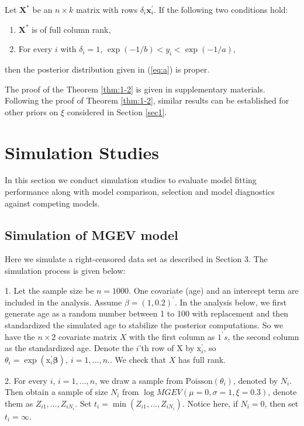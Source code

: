 \documentclass[smallextended]{svjour3}       %
\begin{document}
{\begin{theorem} \label{thm:1-2}
\noindent
Let $\mathbb{\mathbf{X}}^{*}$ be
an $n\times k$ matrix with rows $\delta_{i}\mathbf{x}_{i}^{\prime}$.
If the following two conditions hold:
\begin{enumerate}
\item $\mathbb{\mathbf{X}}^{*}$ is of full column rank,
\item For every $i$ with $\delta_{i}=1$, $\exp(-1/b) < y_{i} < \exp(-1/a)$,
\end{enumerate}
then the posterior distribution given in (\ref{eq:a}) is proper.
\end{theorem}
\noindent
The proof of the Theorem \ref{thm:1-2} is given in supplementary materials. Following the proof of Theorem \ref{thm:1-2}, similar results can be established for other priors on $\xi$
considered in Section \ref{sec1}.

\section{Simulation Studies}
In this section we conduct simulation studies to evaluate model fitting performance along with model comparison, selection and model diagnostics against competing models.
\subsection{Simulation of MGEV model}
Here we simulate a right-censored data set as described in Section
3. The simulation process is given below:

1. Let the sample size be $n=1000$. One covariate (age) and an intercept term are
included in the analysis. Assume $\beta=(1,0.2)^{\prime}$. In the analysis below, we first generate age as a random number between 1 to 100 with replacement and then 
standardized the simulated age to stabilize the posterior computations. So we have the $n\times2$ covariate matrix $X$ with the first column as $1^{'}s$, the second column as the standardized age. Denote the $i$'th row of X by $\mbox{x}_{i}^{'}$, so $\theta_{i}=\exp(\mbox{x}_{i}^{\prime}\boldsymbol\beta),\ i=1,...,n.$. We check that $X$ has full rank. 

2. For every $i$, $i=1,...,n$, we draw a sample from $\mbox{Poisson}(\theta_{i})$,
denoted by $N_{i}$. Then obtain a sample of size $N_{i}$ from $\log MGEV(\mu=0,\sigma=1,\xi=0.3)$, denote them as $Z_{i1},\ldots,Z_{iN_{i}}$.
Set $t_{i}=\min(Z_{i1},\ldots,Z_{iN_{i}}).$ Notice here, if $N_{i}=0$,
then set $t_{i}=\infty.$

}
\end{document}
